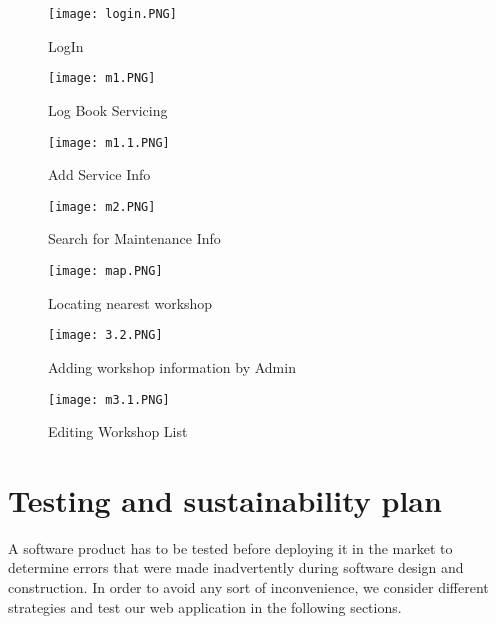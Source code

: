 \documentclass[11pt]{article} %
\begin{document}
	\begin{figure}[!hbt]
		\centering
        \texttt{[image: login.PNG]} \par 
        \caption{LogIn}
        \label{fig:login}
    \end{figure}
	
	\begin{figure}[!hbt]
		\centering
        \texttt{[image: m1.PNG]} \par
        \caption{Log Book Servicing}
        \label{fig:LogBook}
    \end{figure}
    
    \begin{figure}[!hbt]
		\centering
        \texttt{[image: m1.1.PNG]} \par
        \caption{Add Service Info}
        \label{fig:Add Service}
    \end{figure}
    
    \begin{figure}[!hbt]
		\centering
        \texttt{[image: m2.PNG]} \par
        \caption{Search for Maintenance Info}
        \label{fig:Maintenance}
    \end{figure}
    
    \begin{figure}[!hbt]
		\centering
        \texttt{[image: map.PNG]} \par
        \caption{Locating nearest workshop}
        \label{fig:workshop}
    \end{figure}
    
    \begin{figure}[!hbt]
		\centering
        \texttt{[image: 3.2.PNG]} \par
        \caption{Adding workshop information by Admin}
        \label{fig:add workshop}
    \end{figure}
    
    \begin{figure}[!hbt]
		\centering
        \texttt{[image: m3.1.PNG]} \par
        \caption{Editing Workshop List}
        \label{fig:edit workshop}
    \end{figure}
    
    

\section{Testing and sustainability plan}
A software product has to be tested before deploying it in the market to determine errors that were made inadvertently during software design and construction. In order to avoid any sort of inconvenience, we consider different strategies and test our web application in the following sections.
\end{document}
